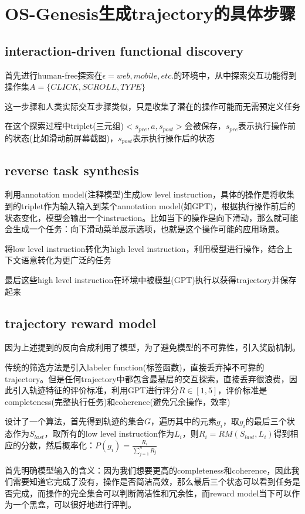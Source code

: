 \documentclass[a4paper,12pt]{article}
\begin{document}
\section{OS-Genesis生成trajectory的具体步骤}
\subsection{interaction-driven functional discovery}
首先进行human-free探索在$\epsilon = web, mobile, etc.$的环境中，从中探索交互功能得到操作集$A = \{CLICK, SCROLL, TYPE\}$

这一步骤和人类实际交互步骤类似，只是收集了潜在的操作可能而无需预定义任务

在这个探索过程中triplet(三元组)$<s_{pre}, a, s_{post}>$会被保存，$s_{pre}$表示执行操作前的状态(比如滑动前屏幕截图)，$s_{post}$表示执行操作后的状态

\subsection{reverse task synthesis}
利用annotation model(注释模型)生成low level instruction，具体的操作是将收集到的triplet作为输入输入到某个annotation model(如GPT)，根据执行操作前后的状态变化，模型会输出一个instruction。比如当下的操作是向下滑动，那么就可能会生成一个任务：向下滑动菜单展示选项，也就是这个操作可能的应用场景。

将low level instruction转化为high level instruction，利用模型进行操作，结合上下文语意转化为更广泛的任务

最后这些high level instruction在环境中被模型(GPT)执行以获得trajectory并保存起来

\subsection{trajectory reward model}
因为上述提到的反向合成利用了模型，为了避免模型的不可靠性，引入奖励机制。

传统的筛选方法是引入labeler function(标签函数)，直接丢弃掉不可靠的trajectory。但是任何trajectory中都包含最基层的交互探索，直接丢弃很浪费，因此引入轨迹特征的评价标准，利用GPT进行评分$R \in [1, 5]$，评价标准是completeness(完整执行任务)和coherence(避免冗余操作，效率)

设计了一个算法，首先得到轨迹的集合$G$，遍历其中的元素$g_i$，取$g_i$的最后三个状态作为$S_{last}$，取所有的low level instruction作为$L_i$，则$R_i = RM(S_{last}, L_i)$得到相应的分数，然后概率化：$P(g_i) = \frac{R_i}{\sum_{j=1}^{n}R_j}$

首先明确模型输入的含义：因为我们想要更高的completeness和coherence，因此我们需要知道它完成了没有，操作是否简洁高效，那么最后三个状态可以看到任务是否完成，而操作的完全集合可以判断简洁性和冗余性，而reward model当下可以作为一个黑盒，可以很好地进行评判。
\end{document}
